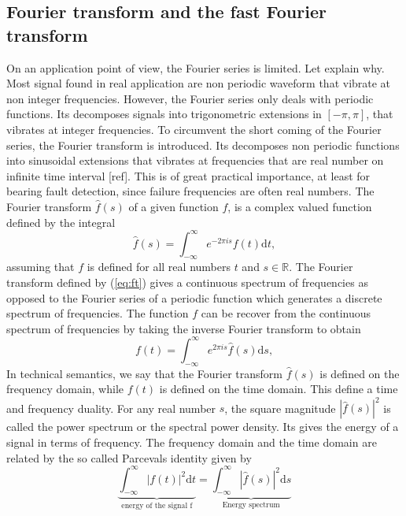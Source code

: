 \documentclass[../Main/thesis.tex]{subfiles}
\begin{document}
\subsection{Fourier transform and the fast Fourier transform}
\label{sec:fouurier-transform}
On an application point of view, the Fourier series is limited. Let explain why. Most signal found in real application are non periodic waveform that vibrate at non integer frequencies. However, the Fourier series only deals with periodic functions. Its decomposes signals into trigonometric extensions in $[-\pi, \pi]$, that vibrates at integer frequencies. To circumvent the short coming of the Fourier series, the Fourier transform is introduced. Its decomposes non periodic functions into sinusoidal extensions that vibrates at frequencies that are real number on infinite time interval [ref]. This is of great practical importance, at least for bearing fault detection, since failure frequencies are often real numbers.
\justify
The Fourier transform $\hat{f}(s)$ of a given function $f$, is a complex valued function defined by the integral
\begin{equation}\label{eq:ft}
   \hat{f}(s) = \int_{-\infty}^{\infty}e^{-2\pi i s}f(t)\mathrm{d}t,
\end{equation}
assuming that $f$ is defined for all real numbers $t$ and $s\in\mathbb{R}$. The Fourier transform defined by (\ref{eq:ft}) gives a continuous spectrum of frequencies as opposed to the Fourier series of a periodic function which generates a discrete spectrum of frequencies. The function $f$ can be recover from the continuous spectrum of frequencies by taking the inverse Fourier transform to obtain
\begin{equation}\label{eq:ift}
f(t) = \int_{-\infty}^{\infty}e^{2\pi i s}\hat{f}(s)\mathrm{d}s,
\end{equation}
In technical semantics, we say that the Fourier transform $\hat{f}(s)$ is defined on the frequency domain, while $f(t)$ is defined on the time domain. This define a time and frequency duality. For any real number $s$, the square magnitude $|\hat{f}(s)|^{2}$ is called the power spectrum or the spectral power density. Its gives the energy of a signal in terms of frequency. The frequency domain and the time domain are related by the so called Parcevals identity
given by 
\begin{equation}\label{eq:parceval}
\underbrace{\int_{-\infty}^{\infty}|f(t)|^{2}\mathrm{d}t}_{\text{energy of the signal f}} = \underbrace{\int_{-\infty}^{\infty}|\hat{f}(s)|^{2}\mathrm{d}s}_{\text{Energy spectrum}}
\end{equation}
\end{document}
